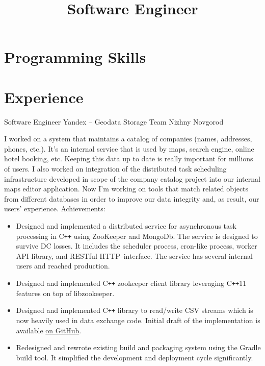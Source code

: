 \documentclass[11pt,a4paper,sans]{moderncv}
\title{Software Engineer}
\newcommand{\Cpp}{C{}\texttt{++}}
\begin{document}
\makecvtitle

\section{Programming Skills}
\cvitem{Proficient}{\Cpp{}, C, Java}

\section{Experience}
{Software Engineer}
{Yandex -- Geodata Storage Team}
{Nizhny Novgorod}
{}
{ I worked on a system that maintains a catalog of companies (names,
  addresses, phones, etc.).  It's an internal service that is used by
  maps, search engine, online hotel booking, etc.  Keeping this data
  up to date is really important for millions of users.
  \newline{} I also worked on integration of the distributed task
  scheduling infrastructure developed in scope of the company catalog
  project into our internal maps editor application.
  \newline{} Now I'm working on tools that match related objects
  from different databases in order to improve our data integrity and,
  as result, our users' experience.
  \newline{}
Achievements:
\begin{itemize}
\item Designed and implemented a distributed service for asynchronous
  task processing in \Cpp{} using ZooKeeper and MongoDb. The service
  is designed to survive DC losses. It includes the scheduler process,
  cron-like process, worker API library, and RESTful
  HTTP--interface. The service has several internal users and reached
  production.
\item Designed and implemented \Cpp{} zookeeper client library leveraging
  \Cpp{}11 features on top of libzookeeper.
\item Designed and implemented \Cpp{} library to read/write CSV
  streams which is now heavily used in data exchange code. Initial
  draft of the implementation is available
  \href{https://github.com/roman-kashitsyn/text-csv}{on GitHub}.
\item Redesigned and rewrote existing build and packaging system using
  the Gradle build tool. It simplified the development and deployment
  cycle significantly.
\end{itemize}
}
\end{document}
